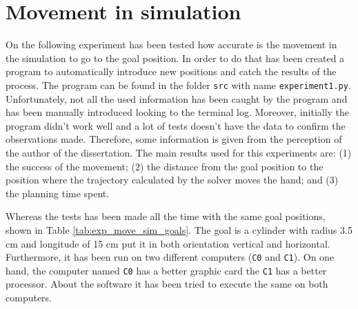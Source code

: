\documentclass[12pt,a4paper,final,twoside,openright]{report}
\begin{document}
\section{Movement in simulation}
\label{sec:exp_move_simulation}



On the following experiment has been tested how accurate is the movement in the simulation to go to the goal position. In order to do that has been created a program to automatically introduce new positions and catch the results of the process. The program can be found in the folder \texttt{src} with name \texttt{experiment1.py}. Unfortunately, not all the used information has been caught by the program and has been manually introduced looking to the terminal log. Moreover, initially the program didn't work well and a lot of tests doesn't have the data to confirm the observations made. Therefore, some information is given from the perception of the author of the dissertation. The main results used for this experiments are: (1) the success of the movement; (2) the distance from the goal position to the position where the trajectory calculated by the solver moves the hand; and (3) the planning time spent.

Whereas the tests has been made all the time with the same goal positions, shown in Table \ref{tab:exp_move_sim_goals}. The goal is a cylinder with radius 3.5 cm and longitude of 15 cm put it in both orientation vertical and horizontal. Furthermore, it has been run on two different computers (\texttt{C0} and \texttt{C1}). On one hand, the computer named \texttt{C0} has a better graphic card the \texttt{C1} has a better processor. About the software it has been tried to execute the same on both computers.
\end{document}

